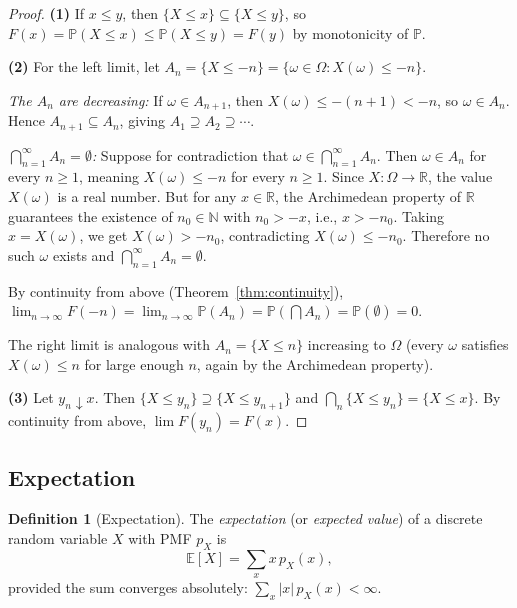 \documentclass[11pt,a4paper]{article}
\theoremstyle{definition}
\newtheorem{definition}{Definition}[section]
\theoremstyle{plain}
\theoremstyle{remark}
\newcommand{\E}{\mathbb{E}}
\newcommand{\Prob}{\mathbb{P}}
\begin{document}
\begin{proof}
\textbf{(1)} If $x \leq y$, then $\{X \leq x\} \subseteq \{X \leq y\}$, so $F(x) = \Prob(X \leq x) \leq \Prob(X \leq y) = F(y)$ by monotonicity of $\Prob$.

\textbf{(2)} For the left limit, let $A_n = \{X \leq -n\} = \{\omega \in \Omega : X(\omega) \leq -n\}$.

\emph{The $A_n$ are decreasing:} If $\omega \in A_{n+1}$, then $X(\omega) \leq -(n+1) < -n$, so $\omega \in A_n$. Hence $A_{n+1} \subseteq A_n$, giving $A_1 \supseteq A_2 \supseteq \cdots$.

\emph{$\bigcap_{n=1}^\infty A_n = \emptyset$:} Suppose for contradiction that $\omega \in \bigcap_{n=1}^\infty A_n$. Then $\omega \in A_n$ for every $n \geq 1$, meaning $X(\omega) \leq -n$ for every $n \geq 1$. Since $X : \Omega \to \mathbb{R}$, the value $X(\omega)$ is a real number. But for any $x \in \mathbb{R}$, the Archimedean property of $\mathbb{R}$ guarantees the existence of $n_0 \in \mathbb{N}$ with $n_0 > -x$, i.e., $x > -n_0$. Taking $x = X(\omega)$, we get $X(\omega) > -n_0$, contradicting $X(\omega) \leq -n_0$. Therefore no such $\omega$ exists and $\bigcap_{n=1}^\infty A_n = \emptyset$.

By continuity from above (Theorem~\ref{thm:continuity}), $\lim_{n \to \infty} F(-n) = \lim_{n \to \infty} \Prob(A_n) = \Prob(\bigcap A_n) = \Prob(\emptyset) = 0$.

The right limit is analogous with $A_n = \{X \leq n\}$ increasing to $\Omega$ (every $\omega$ satisfies $X(\omega) \leq n$ for large enough $n$, again by the Archimedean property).

\textbf{(3)} Let $y_n \downarrow x$. Then $\{X \leq y_n\} \supseteq \{X \leq y_{n+1}\}$ and $\bigcap_n \{X \leq y_n\} = \{X \leq x\}$. By continuity from above, $\lim F(y_n) = F(x)$.
\end{proof}

\subsection{Expectation}
\label{subsec:expectation}

\begin{definition}[Expectation]
\label{def:expectation}
The \emph{expectation} (or \emph{expected value}) of a discrete random variable $X$ with PMF $p_X$ is
\begin{equation}
    \E[X] = \sum_{x} x\, p_X(x),
    \label{eq:expectation_def}
\end{equation}
provided the sum converges absolutely: $\sum_x |x|\, p_X(x) < \infty$.
\end{definition}
\end{document}

